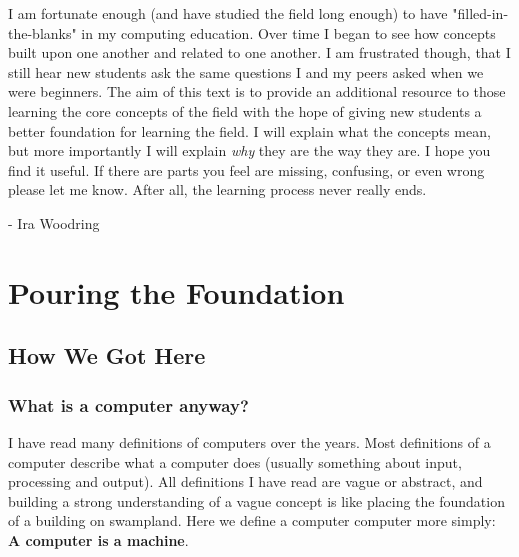 \documentclass[11pt,fleqn]{book} %
\begin{document}
I am fortunate enough (and have studied the field long enough) to have "filled-in-the-blanks" in my computing education.  Over time I began to see how concepts built upon one another and related to one another.  I am frustrated though, that I still hear new students ask the same questions I and my peers asked when we were beginners.  The aim of this text is to provide an additional resource to those learning the core concepts of the field with the hope of giving new students a better foundation for learning the field.  I will explain what the concepts mean, but more importantly I will explain \textit{why} they are the way they are.  I hope you find it useful.  If there are parts you feel are missing, confusing, or even wrong please let me know.  After all, the learning process never really ends.

- Ira Woodring 



\part{Pouring the Foundation}



\chapter{How We Got Here}

\section{What is a computer anyway?}

I have read many definitions of computers over the years.  Most definitions of a computer describe what a computer  does (usually something about input, processing and output).  All definitions I have read are vague or abstract, and building a strong understanding of a vague concept is like placing the foundation of a building on swampland.  Here we define a computer \gls{computer} more simply:  \textbf{A computer is a machine}.
\end{document}
